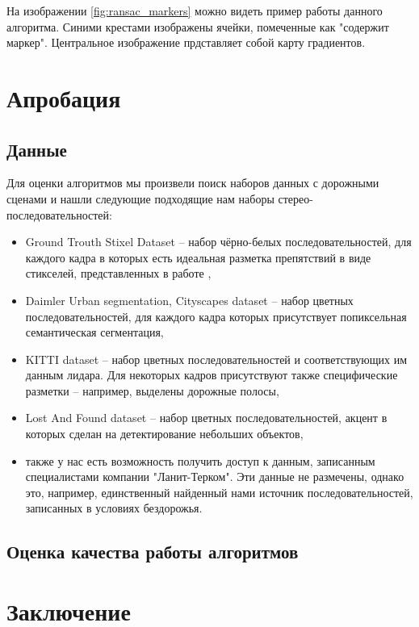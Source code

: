 \documentclass[aps,%
14pt,%
final,%
oneside,
onecolumn,%
musixtex, %
superscriptaddress,%
centertags]{extarticle} %
\begin{document}
На изображении \ref{fig:ransac_markers} можно видеть пример работы данного алгоритма. Синими крестами изображены ячейки, помеченные как "содержит маркер". Центральное изображение прдставляет собой карту градиентов.

\section{Апробация}

\subsection{Данные}

Для оценки алгоритмов мы произвели поиск наборов данных с дорожными сценами и нашли следующие подходящие нам наборы стерео-последовательностей:

\begin{itemize}
    \item Ground Trouth Stixel Dataset -- набор чёрно-белых последовательностей, для каждого кадра в которых есть идеальная разметка препятствий в виде стикселей, представленных в работе \cite{pfeiffer2010efficient},
    \item Daimler Urban segmentation, Cityscapes dataset -- набор цветных последовательностей, для каждого кадра которых присутствует попиксельная семантическая сегментация,
    \item KITTI dataset -- набор цветных последовательностей и соответствующих им данным лидара. Для некоторых кадров присутствуют также специфические разметки -- например, выделены дорожные полосы,
    \item Lost And Found dataset -- набор цветных последовательностей, акцент в которых сделан на детектирование небольших объектов,
    \item также у нас есть возможность получить доступ к данным, записанным специалистами компании "Ланит-Терком". Эти данные не размечены, однако это, например, единственный найденный нами источник последовательностей, записанных в условиях бездорожья.
\end{itemize}

\subsection{Оценка качества работы алгоритмов}

\section{Заключение}
\end{document}
